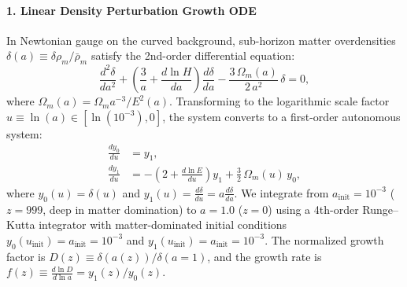 \documentclass[11pt,a4paper]{article}
\theoremstyle{definition}
\begin{document}
\paragraph{1. Linear Density Perturbation Growth ODE}
In Newtonian gauge on the curved background, sub-horizon matter overdensities $\delta(a) \equiv \delta\rho_m / \bar{\rho}_m$ satisfy the 2nd-order differential equation:
\begin{equation}
\frac{d^2 \delta}{da^2} + \left( \frac{3}{a} + \frac{d\ln H}{da} \right) \frac{d\delta}{da} - \frac{3\,\Omega_m(a)}{2\,a^2}\,\delta = 0,
\end{equation}
where $\Omega_m(a) = \Omega_m a^{-3} / E^2(a)$. Transforming to the logarithmic scale factor $u \equiv \ln(a) \in [\ln(10^{-3}), 0]$, the system converts to a first-order autonomous system:
\begin{align}
\frac{dy_0}{du} &= y_1, \\
\frac{dy_1}{du} &= -\left( 2 + \frac{d\ln E}{du} \right) y_1 + \frac{3}{2}\,\Omega_m(u)\,y_0,
\end{align}
where $y_0(u) = \delta(u)$ and $y_1(u) = \frac{d\delta}{du} = a \frac{d\delta}{da}$. We integrate from $a_{\mathrm{init}} = 10^{-3}$ ($z = 999$, deep in matter domination) to $a = 1.0$ ($z = 0$) using a 4th-order Runge--Kutta integrator with matter-dominated initial conditions $y_0(u_{\mathrm{init}}) = a_{\mathrm{init}} = 10^{-3}$ and $y_1(u_{\mathrm{init}}) = a_{\mathrm{init}} = 10^{-3}$. The normalized growth factor is $D(z) \equiv \delta(a(z)) / \delta(a=1)$, and the growth rate is $f(z) \equiv \frac{d\ln D}{d\ln a} = y_1(z) / y_0(z)$.
\end{document}
